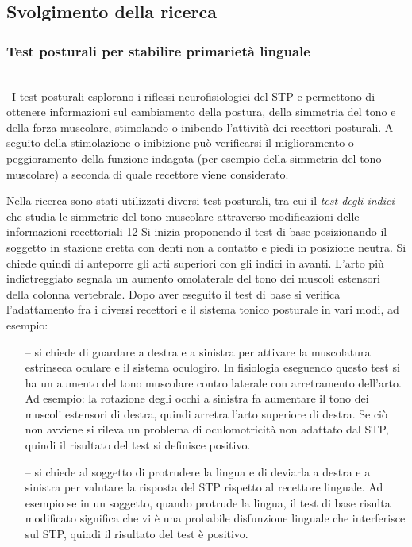 \subsection{Svolgimento della ricerca}

\subsubsection{Test posturali per stabilire primarietà linguale}
\\\
I test posturali esplorano i riflessi neurofisiologici del STP e permettono di ottenere informazioni sul cambiamento
della postura, della simmetria del tono e della forza muscolare, stimolando o inibendo l’attività dei recettori posturali.
A seguito della stimolazione o inibizione può verificarsi il miglioramento o peggioramento della funzione indagata (per
esempio della simmetria del tono muscolare) a seconda di quale recettore viene considerato.

Nella ricerca sono stati utilizzati diversi test posturali, tra cui il \emph{test degli indici} che studia le simmetrie del tono
muscolare attraverso modificazioni delle informazioni recettoriali\cite{bib6} 12 Si inizia proponendo il test di base posizionando il
soggetto in stazione eretta con denti non a contatto e piedi in posizione neutra. Si chiede quindi di anteporre gli arti
superiori con gli indici in avanti. L’arto più indietreggiato segnala un aumento omolaterale del tono dei muscoli
estensori della colonna vertebrale. Dopo aver eseguito il test di base si verifica l’adattamento fra i diversi recettori e il
sistema tonico posturale in vari modi, ad esempio:
\begin{itemize}
 \itemsep-0.5em
 \item[--]si chiede di guardare a destra e a sinistra per attivare la muscolatura estrinseca oculare e il sistema oculogiro. In
fisiologia eseguendo questo test si ha un aumento del tono muscolare contro laterale con arretramento dell’arto. Ad
esempio: la rotazione degli occhi a sinistra fa aumentare il tono dei muscoli estensori di destra, quindi arretra l’arto
superiore di destra. Se ciò non avviene si rileva un problema di oculomotricità non adattato dal STP, quindi il risultato
del test si definisce positivo.
 \item[--]si chiede al soggetto di protrudere la lingua e di deviarla a destra e a sinistra per valutare la risposta del STP rispetto al
recettore linguale. Ad esempio se in un soggetto, quando protrude la lingua, il test di base risulta modificato significa
che vi è una probabile disfunzione linguale che interferisce sul STP, quindi il risultato del test è positivo.
\end{itemize}

